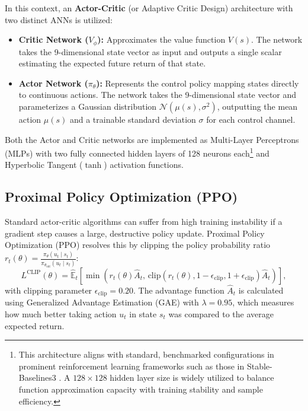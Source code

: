 In this context, an \textbf{Actor-Critic} (or Adaptive Critic Design) architecture with two distinct ANNs is utilized:
\begin{itemize}[leftmargin=*,label=$\bullet$]
    \item \textbf{Critic Network ($V_\phi$):} Approximates the value function $V(s)$. The network takes the 9-dimensional state vector as input and outputs a single scalar estimating the expected future return of that state.
    \item \textbf{Actor Network ($\pi_\theta$):} Represents the control policy mapping states directly to continuous actions. The network takes the 9-dimensional state vector and parameterizes a Gaussian distribution $\mathcal{N}(\mu(s), \sigma^2)$, outputting the mean action $\mu(s)$ and a trainable standard deviation $\sigma$ for each control channel.
\end{itemize}
Both the Actor and Critic networks are implemented as Multi-Layer Perceptrons (MLPs) with two fully connected hidden layers of 128 neurons each\footnote{This architecture aligns with standard, benchmarked configurations in prominent reinforcement learning frameworks such as those in Stable-Baselines3 \cite{raffin2021stable}. A $128\times 128$ hidden layer size is widely utilized to balance function approximation capacity with training stability and sample efficiency.} and Hyperbolic Tangent ($\tanh$) activation functions.


\subsection{Proximal Policy Optimization (PPO)}
Standard actor-critic algorithms can suffer from high training instability if a gradient step causes a large, destructive policy update. Proximal Policy Optimization (PPO) \cite{schulman2017proximal} resolves this by clipping the policy probability ratio $r_t(\theta) = \frac{\pi_\theta(u_t \mid s_t)}{\pi_{\theta_{\text{old}}}(u_t \mid s_t)}$:
\begin{equation}
    L^{\text{CLIP}}(\theta) = \hat{\mathbb{E}}_t \left[ \min\left( r_t(\theta)\hat{A}_t, \, \text{clip}(r_t(\theta), 1-\epsilon_{\text{clip}}, 1+\epsilon_{\text{clip}})\hat{A}_t \right) \right],
    \label{eq:ppo_clip}
\end{equation}
with clipping parameter $\epsilon_{\text{clip}} = 0.20$. The advantage function $\hat{A}_t$ is calculated using Generalized Advantage Estimation (GAE) \cite{schulman2015high} with $\lambda = 0.95$, which measures how much better taking action $u_t$ in state $s_t$ was compared to the average expected return.


